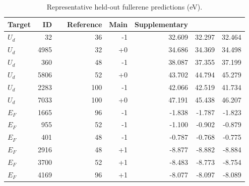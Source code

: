 \begin{table}[t]
\centering
\caption{Representative held-out fullerene predictions (eV).}
\begin{tabular}{lrrrrrr}
\toprule
Target & ID & \ \ Reference & Main & Supplementary \\
\midrule
$U_d$ & 32 & 36 & -1 & 32.609 & 32.297 & 32.464 \\
$U_d$ & 4985 & 32 & +0 & 34.686 & 34.369 & 34.498 \\
$U_d$ & 360 & 48 & -1 & 38.087 & 37.355 & 37.199 \\
$U_d$ & 5806 & 52 & +0 & 43.702 & 44.794 & 45.279 \\
$U_d$ & 2283 & 100 & -1 & 42.066 & 42.519 & 41.734 \\
$U_d$ & 7033 & 100 & +0 & 47.191 & 45.438 & 46.207 \\
$E_F$ & 1665 & 96 & -1 & -1.838 & -1.787 & -1.823 \\
$E_F$ & 955 & 52 & -1 & -1.100 & -0.902 & -0.879 \\
$E_F$ & 401 & 48 & -1 & -0.787 & -0.768 & -0.775 \\
$E_F$ & 2916 & 48 & +1 & -8.877 & -8.882 & -8.884 \\
$E_F$ & 3700 & 52 & +1 & -8.483 & -8.773 & -8.754 \\
$E_F$ & 4169 & 96 & +1 & -8.077 & -8.097 & -8.089 \\
\bottomrule
\end{tabular}
\end{table}
